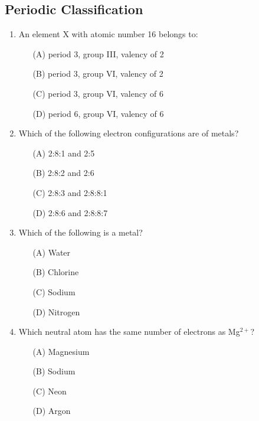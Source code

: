 \subsection{Periodic Classification}

\begin{enumerate}
	\item An element X with atomic number 16 belongs to:
	\begin{enumerate}[topsep=0ex,itemsep=0ex,partopsep=1ex,parsep=1ex]
		\item[(A)] period 3, group III, valency of 2
		\item[(B)] period 3, group VI, valency of 2
		\item[(C)] period 3, group VI, valency of 6
		\item[(D)] period 6, group VI, valency of 6
	\end{enumerate}
	
	\item Which of the following electron configurations are of metals?
	\begin{enumerate}[topsep=0ex,itemsep=0ex,partopsep=1ex,parsep=1ex]
		\item[(A)] 2:8:1 and 2:5
		\item[(B)] 2:8:2 and 2:6
		\item[(C)] 2:8:3 and 2:8:8:1
		\item[(D)] 2:8:6 and 2:8:8:7
	\end{enumerate}
	
	\item Which of the following is a metal?
	\begin{enumerate}[topsep=0ex,itemsep=0ex,partopsep=1ex,parsep=1ex]
		\item[(A)] Water
		\item[(B)] Chlorine
		\item[(C)] Sodium
		\item[(D)] Nitrogen
	\end{enumerate}
	
	\item Which neutral atom has the same number of electrons as Mg$^{2+}$?
	\begin{enumerate}[topsep=0ex,itemsep=0ex,partopsep=1ex,parsep=1ex]
		\item[(A)] Magnesium
		\item[(B)] Sodium
		\item[(C)] Neon
		\item[(D)] Argon
	\end{enumerate}
	

\end{enumerate}
